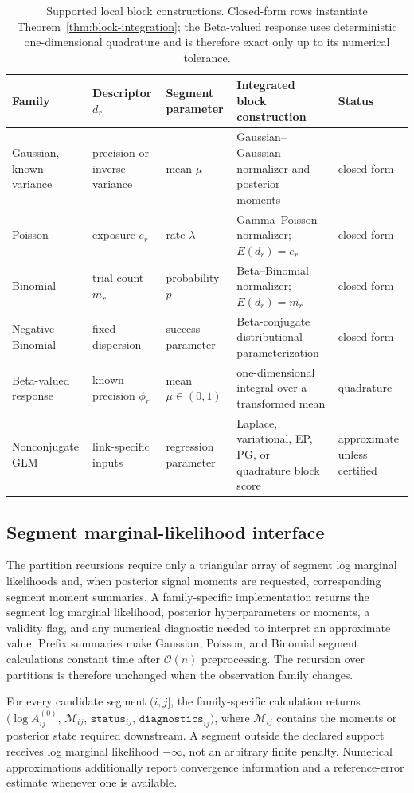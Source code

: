 \begin{table}[t]
\centering
\small
\caption{Supported local block constructions. Closed-form rows instantiate Theorem~\ref{thm:block-integration}; the Beta-valued response uses deterministic one-dimensional quadrature and is therefore exact only up to its numerical tolerance.}
\label{tab:block-families}
\begin{tabularx}{0.97\textwidth}{@{}L{0.15\textwidth}L{0.19\textwidth}L{0.17\textwidth}Y L{0.16\textwidth}@{}}
\toprule
Family & Descriptor $d_r$ & Segment parameter & Integrated block construction & Status \\
\midrule
Gaussian, known variance & precision or inverse variance & mean $\mu$ & Gaussian--Gaussian normalizer and posterior moments & closed form \\
Poisson & exposure $e_r$ & rate $\lambda$ & Gamma--Poisson normalizer; $E(d_r)=e_r$ & closed form \\
Binomial & trial count $m_r$ & probability $p$ & Beta--Binomial normalizer; $E(d_r)=m_r$ & closed form \\
Negative Binomial & fixed dispersion & success parameter & Beta-conjugate distributional parameterization & closed form \\
Beta-valued response & known precision $\phi_r$ & mean $\mu\in(0,1)$ & one-dimensional integral over a transformed mean & quadrature \\
Nonconjugate GLM & link-specific inputs & regression parameter & Laplace, variational, EP, PG, or quadrature block score & approximate unless certified \\
\bottomrule
\end{tabularx}
\end{table}

\subsection{Segment marginal-likelihood interface}
The partition recursions require only a triangular array of segment log marginal likelihoods and, when posterior signal moments are requested, corresponding segment moment summaries. A family-specific implementation returns the segment log marginal likelihood, posterior hyperparameters or moments, a validity flag, and any numerical diagnostic needed to interpret an approximate value. Prefix summaries make Gaussian, Poisson, and Binomial segment calculations constant time after $\mathcal O(n)$ preprocessing. The recursion over partitions is therefore unchanged when the observation family changes.

\begin{specificationbox}
For every candidate segment $(i,j]$, the family-specific calculation returns
$\bigl(\log A^{(0)}_{ij},\,\mathcal M_{ij},\,\texttt{status}_{ij},\,\texttt{diagnostics}_{ij}\bigr)$,
where $\mathcal M_{ij}$ contains the moments or posterior state required downstream. A segment outside the declared support receives log marginal likelihood $-\infty$, not an arbitrary finite penalty. Numerical approximations additionally report convergence information and a reference-error estimate whenever one is available.
\end{specificationbox}
